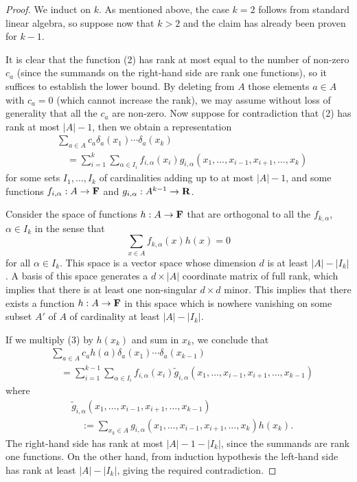 \documentclass[UTF8,11pt]{ctexart}
\theoremstyle{definition}
\begin{document}
\begin{proof}
We induct on $k$. As mentioned above, the case $k=2$ follows from standard linear algebra, so suppose now that $k>2$ and the claim has already been proven for $k-1$.

It is clear that the function (2) has rank at most equal to the number of non-zero $c_a$ (since the summands on the right-hand side are rank one functions), so it suffices to establish the lower bound. By deleting from $A$ those elements $a\in A$ with $c_a=0$ (which cannot increase the rank), we may assume without loss of generality that all the $c_a$ are non-zero. Now suppose for contradiction that (2) has rank at most $|A|-1$, then we obtain a representation
\begin{equation}
\begin{split}
&\sum_{a\in A}c_a\delta_a(x_1)\cdots\delta_a(x_k)\\
&\quad=\sum_{i=1}^k\sum_{\alpha\in I_i}f_{i,\alpha}(x_i)g_{i,\alpha}(x_1,\ldots,x_{i-1},x_{i+1},\ldots,x_k)
\end{split}\tag{3}
\end{equation}
for some sets $I_1,\ldots,I_k$ of cardinalities adding up to at most $|A|-1$, and some functions $f_{i,\alpha}:A\to{\bf F}$ and $g_{i,\alpha}:A^{k-1}\to{\bf R}$.

Consider the space of functions $h:A\to{\bf F}$ that are orthogonal to all the $f_{k,\alpha}$, $\alpha\in I_k$ in the sense that
\[
\sum_{x\in A}f_{k,\alpha}(x)h(x)=0
\]
for all $\alpha\in I_k$. This space is a vector space whose dimension $d$ is at least $|A|-|I_k|$. A basis of this space generates a $d\times|A|$ coordinate matrix of full rank, which implies that there is at least one non-singular $d\times d$ minor. This implies that there exists a function $h:A\to{\bf F}$ in this space which is nowhere vanishing on some subset $A'$ of $A$ of cardinality at least $|A|-|I_k|$.

If we multiply (3) by $h(x_k)$ and sum in $x_k$, we conclude that
\[
\begin{split}
&\sum_{a\in A}c_ah(a)\delta_a(x_1)\cdots\delta_a(x_{k-1})\\
&\quad=\sum_{i=1}^{k-1}\sum_{\alpha\in I_i}f_{i,\alpha}(x_i)\tilde g_{i,\alpha}(x_1,\ldots,x_{i-1},x_{i+1},\ldots,x_{k-1})
\end{split}
\]
where
\[
\begin{split}
&\tilde g_{i,\alpha}(x_1,\ldots,x_{i-1},x_{i+1},\ldots,x_{k-1})\\
&\quad:=\sum_{x_k\in A}g_{i,\alpha}(x_1,\ldots,x_{i-1},x_{i+1},\ldots,x_k)h(x_k).
\end{split}
\]
The right-hand side has rank at most $|A|-1-|I_k|$, since the summands are rank one functions. On the other hand, from induction hypothesis the left-hand side has rank at least $|A|-|I_k|$, giving the required contradiction.
\end{proof}
\end{document}

